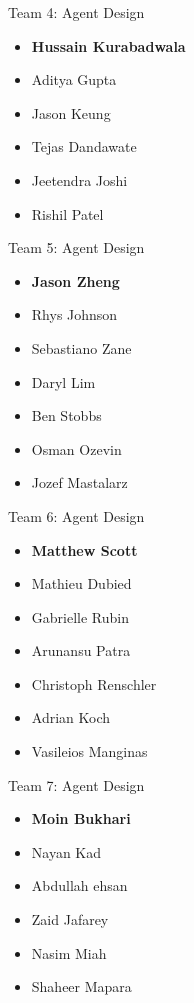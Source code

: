 Team 4: Agent Design
\begin{itemize}
    \item \textbf{Hussain Kurabadwala}
    \item Aditya Gupta
    \item Jason Keung
    \item Tejas Dandawate
    \item Jeetendra Joshi
    \item Rishil Patel
\end{itemize}

Team 5: Agent Design
\begin{itemize}
    \item \textbf{Jason Zheng}
    \item Rhys Johnson
    \item Sebastiano Zane
    \item Daryl Lim
    \item Ben Stobbs
    \item Osman Ozevin
    \item Jozef Mastalarz
\end{itemize}

Team 6: Agent Design
\begin{itemize}
    \item \textbf{Matthew Scott}
    \item Mathieu Dubied
    \item Gabrielle Rubin
    \item Arunansu Patra
    \item Christoph Renschler
    \item Adrian Koch
    \item Vasileios Manginas
\end{itemize}

Team 7: Agent Design
\begin{itemize}
    \item \textbf{Moin Bukhari}
    \item Nayan Kad
    \item Abdullah ehsan
    \item Zaid Jafarey
    \item Nasim Miah
    \item Shaheer Mapara
\end{itemize}
